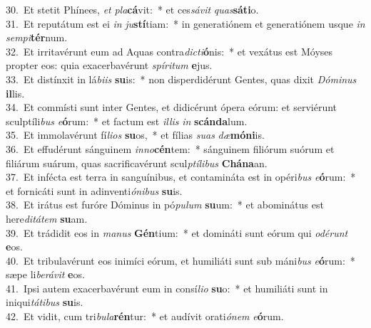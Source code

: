 {30.~}Et stetit Phínees, \textit{et} \textit{pla}\textbf{cá}vit:~* et ces\textit{sá}\textit{vit} \textit{quas}\textbf{sá}\textbf{ti}o.\\
{31.~}Et reputátum est ei \textit{in} \textit{ju}\textbf{stí}tiam:~* in generatiónem et generatiónem usque \textit{in} \textit{sem}\textit{pi}\textbf{tér}num.\\
{32.~}Et irritavérunt eum ad Aquas contra\textit{di}\textit{cti}\textbf{ó}nis:~* et vexátus est Móyses propter eos: quia exacerbavérunt \textit{spí}\textit{ri}\textit{tum} \textbf{e}jus.\\
{33.~}Et distínxit in lá\textit{bi}\textit{is} \textbf{su}is:~* non disperdidérunt Gentes, quas dixit \textit{Dó}\textit{mi}\textit{nus} \textbf{il}lis.\\
{34.~}Et commísti sunt inter Gentes, et didicérunt ópera eórum: et serviérunt sculptíli\textit{bus} \textit{e}\textbf{ó}rum:~* et factum est \textit{il}\textit{lis} \textit{in} \textbf{scán}\textbf{da}lum.\\
{35.~}Et immolavérunt fí\textit{li}\textit{os} \textbf{su}os,~* et fílias \textit{su}\textit{as} \textit{dæ}\textbf{mó}\textbf{ni}is.\\
{36.~}Et effudérunt sánguinem \textit{in}\textit{no}\textbf{cén}tem:~* sánguinem filiórum suórum et filiárum suárum, quas sacrificavérunt scul\textit{ptí}\textit{li}\textit{bus} \textbf{Chá}\textbf{na}an.\\
{37.~}Et infécta est terra in sanguínibus, et contamináta est in opéri\textit{bus} \textit{e}\textbf{ó}rum:~* et fornicáti sunt in adinventi\textit{ó}\textit{ni}\textit{bus} \textbf{su}is.\\
{38.~}Et irátus est furóre Dóminus in pó\textit{pu}\textit{lum} \textbf{su}um:~* et abominátus est here\textit{di}\textit{tá}\textit{tem} \textbf{su}am.\\
{39.~}Et trádidit eos in \textit{ma}\textit{nus} \textbf{Gén}tium:~* et domináti sunt eórum qui \textit{o}\textit{dé}\textit{runt} \textbf{e}os.\\
{40.~}Et tribulavérunt eos inimíci eórum, et humiliáti sunt sub máni\textit{bus} \textit{e}\textbf{ó}rum:~* sæpe li\textit{be}\textit{rá}\textit{vit} \textbf{e}os.\\
{41.~}Ipsi autem exacerbavérunt eum in consí\textit{li}\textit{o} \textbf{su}o:~* et humiliáti sunt in iniqui\textit{tá}\textit{ti}\textit{bus} \textbf{su}is.\\
{42.~}Et vidit, cum tri\textit{bu}\textit{la}\textbf{rén}tur:~* et audívit orati\textit{ó}\textit{nem} \textit{e}\textbf{ó}rum.\\

